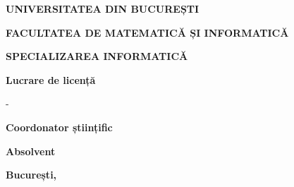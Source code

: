 \begin{titlepage}
    \begin{center}
        \large
        \textbf{\MakeUppercase{Universitatea din București}}
        
        \textbf{\MakeUppercase{Facultatea de Matematică și Informatică}}
        
        \textbf{\MakeUppercase{Specializarea Informatică}}
        
        \vspace{3.5cm}
        
        \textbf{Lucrare de licență}
        
        \huge
        \textbf{\thesistitle}
        
        \large
        -\\
        \textbf{\thesissubtitle}
        
        \vspace{7.5cm}
        
        \begin{minipage}{7cm}
            \textbf{Coordonator științific}\\
            \textbf{\prof}
        \end{minipage}
        \hfill
        \begin{minipage}{3.3cm}
            \textbf{Absolvent}\\
            \textbf{\student}
        \end{minipage}
        
        \vfill
        \textbf{București, \cloudSession}
        
    \end{center}
\end{titlepage}
